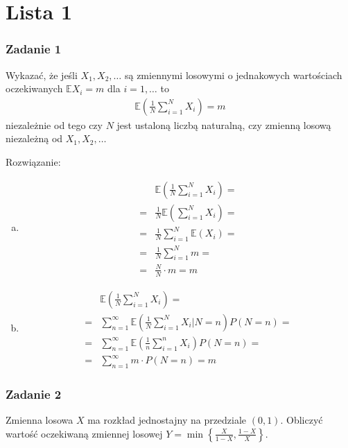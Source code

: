 \chapter*{Lista 1}
\subsection*{Zadanie 1}
Wykazać, że jeśli $ X_1,X_2,\dots $ są zmiennymi losowymi o jednakowych wartościach oczekiwanych $ \mathbb E X_i=m $ dla $ i=1,\dots $ to
\begin{gather*}
\mathbb E \left(\frac{1}{N}\sum_{i=1}^{N}X_i\right)=m
\end{gather*}
niezależnie od tego czy $ N $ jest ustaloną liczbą naturalną, czy zmienną losową niezależną od $ X_1,X_2,\dots  $

Rozwiązanie:
\begin{enumerate}[a)]
\item 
\begin{align*}
&\mathbb E  \left(\frac{1}{N}\sum_{i=1}^{N}X_i\right)
=\\=&
\frac{1}{N} \mathbb E \left(\sum_{i=1}^{N}X_i\right)
=\\=&
\frac{1}{N}\sum_{i=1}^{N} \mathbb E \left(X_i\right)
=\\=&
\frac{1}{N}\sum_{i=1}^{N} m
=\\=&
\frac{N}{N}\cdot m=m
\end{align*}
\item 
\begin{align*}
&\mathbb E  \left(\frac{1}{N}\sum_{i=1}^{N}X_i\right)
=\\=&
\sum_{n=1}^{\infty }\mathbb E  \left(\frac{1}{N}\sum_{i=1}^{N}X_i|N=n\right)P\left(N=n\right)
=\\=&
\sum_{n=1}^{\infty }\mathbb E  \left(\frac{1}{n}\sum_{i=1}^{n}X_i\right)P\left(N=n\right)
=\\=&
\sum_{n=1}^{\infty }m\cdot P\left(N=n\right)=m
\end{align*}
\end{enumerate}


\subsection*{Zadanie 2}
Zmienna losowa $ X $ ma rozkład jednostajny na przedziale $ (0,1) $. Obliczyć wartość oczekiwaną zmiennej losowej $ Y=\min\left\{\frac{X}{1-X},\frac{1-X}{X}\right\} $.

